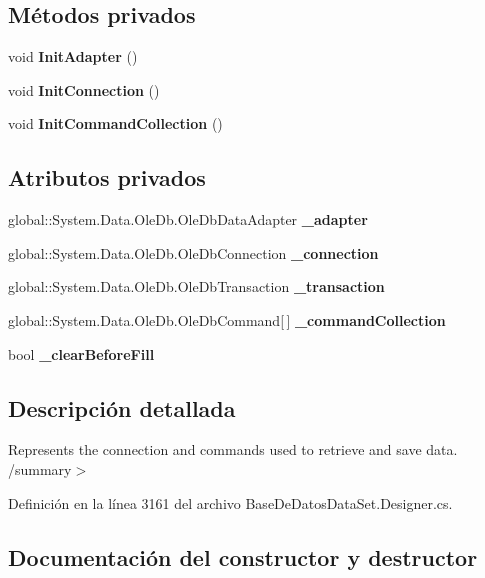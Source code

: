 \subsection*{Métodos privados}
\begin{DoxyCompactItemize}
\item 
void {\bf Init\-Adapter} ()
\item 
void {\bf Init\-Connection} ()
\item 
void {\bf Init\-Command\-Collection} ()
\end{DoxyCompactItemize}
\subsection*{Atributos privados}
\begin{DoxyCompactItemize}
\item 
global\-::\-System.\-Data.\-Ole\-Db.\-Ole\-Db\-Data\-Adapter {\bf \-\_\-adapter}
\item 
global\-::\-System.\-Data.\-Ole\-Db.\-Ole\-Db\-Connection {\bf \-\_\-connection}
\item 
global\-::\-System.\-Data.\-Ole\-Db.\-Ole\-Db\-Transaction {\bf \-\_\-transaction}
\item 
global\-::\-System.\-Data.\-Ole\-Db.\-Ole\-Db\-Command[$\,$] {\bf \-\_\-command\-Collection}
\item 
bool {\bf \-\_\-clear\-Before\-Fill}
\end{DoxyCompactItemize}


\subsection{Descripción detallada}
Represents the connection and commands used to retrieve and save data. /summary$>$ 

Definición en la línea 3161 del archivo Base\-De\-Datos\-Data\-Set.\-Designer.\-cs.



\subsection{Documentación del constructor y destructor}
